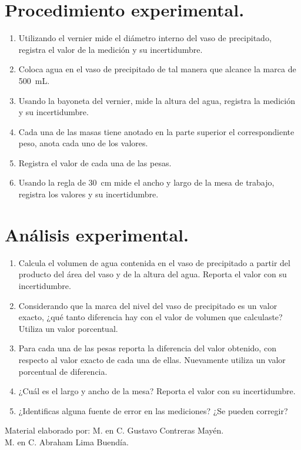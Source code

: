 \section{Procedimiento experimental.}
\begin{enumerate}
\item Utilizando el vernier mide el diámetro interno del vaso de precipitado, registra el valor de la medición y su incertidumbre.
\item Coloca agua en el vaso de precipitado de tal manera que alcance la marca de \SI{500}{\milli\liter}.
\item Usando la bayoneta del vernier, mide la altura del agua, registra la medición y su incertidumbre.
\item Cada una de las masas tiene anotado en la parte superior el correspondiente peso, anota cada uno de los valores.
\item Registra el valor de cada una de las pesas.
\item Usando la regla de \SI{30}{\cm} mide el ancho y largo de la mesa de trabajo, registra los valores y su incertidumbre.
\end{enumerate}
\section{Análisis experimental.}
\begin{enumerate}
\item Calcula el volumen de agua contenida en el vaso de precipitado a partir del producto del área del vaso y de la altura del agua. Reporta el valor con su incertidumbre.
\item Considerando que la marca del nivel del vaso de precipitado es un valor exacto, ¿qué tanto diferencia hay con el valor de volumen que calculaste? Utiliza un valor porcentual.
\item Para cada una de las pesas reporta la diferencia del valor obtenido, con respecto al valor exacto de cada una de ellas. Nuevamente utiliza un valor porcentual de diferencia.
\item ¿Cuál es el largo y ancho de la mesa? Reporta el valor con su incertidumbre.
\item ¿Identificas alguna fuente de error en las mediciones? ¿Se pueden corregir?  
\end{enumerate}
\vfill
\small{Material elaborado por: M. en C. Gustavo Contreras Mayén. \\ \hspace*{4cm} M. en C. Abraham Lima Buendía.}
